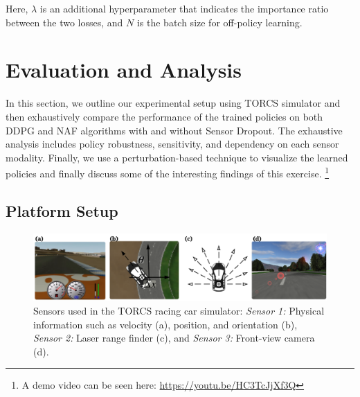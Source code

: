 \documentclass[../thesis.tex]{subfiles}
\begin{document}
Here, $\lambda$ is an additional hyperparameter that indicates the importance ratio between the two losses, and $N$ is the batch size for off-policy learning.
 
 
 
 
 
\section{Evaluation and Analysis} \label{sec:mdrl-results}
In this section, we outline our experimental setup using TORCS simulator and then exhaustively compare the performance of the trained policies on both DDPG and NAF algorithms with and without Sensor Dropout. The exhaustive analysis includes policy robustness, sensitivity, and dependency on each sensor modality. Finally, we use a perturbation-based technique to visualize the learned policies and finally discuss some of the interesting findings of this exercise.
\footnote{A demo video can be seen here: \url{https://youtu.be/HC3TcJjXf3Q}}
 
\subsection{Platform Setup} \label{sec:platform}
 
\begin{figure}[t]
        \centering
        \vskip 0.2in
\includegraphics[width=\columnwidth]{./MultimodalDRL/fig/TORCS.png} %
        \caption{Sensors used in the TORCS racing car simulator: \textit{Sensor 1:} Physical information such as velocity (a), position, and orientation (b), \textit{Sensor 2:} Laser range finder (c), and \textit{Sensor 3:} Front-view camera (d).}
        \label{fig:TORCS}
\end{figure}
 
\end{document}
